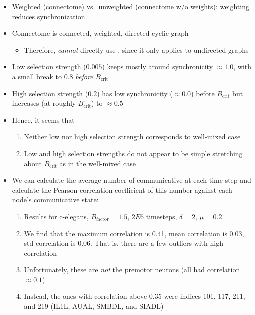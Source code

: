 \documentclass[openacc]{class/rsprocb_new}
\begin{document}
\begin{itemize}
  \item Weighted (connectome) vs.\ unweighted (connectome w/o
    weights): weighting reduces synchronization
  \item Connectome is connected, weighted, directed cyclic graph
  \begin{itemize}
    \item Therefore, \emph{cannot} directly use
      \cite{allen2017evolutionary}, since it only applies to undirected
      graphs
  \end{itemize}
  \item Low selection strength ($0.005$) keeps mostly around synchronicity
    $\approx 1.0$, with a small break to 0.8 \emph{before} $B_{\text{crit}}$
  \item High selection strength ($0.2$) has low synchronicity
    ($\approx 0.0$) before $B_{\text{crit}}$ but increases (at roughly
    $B_{\text{crit}}$) to $\approx 0.5$
  \item Hence, it seems that
  \begin{enumerate}
    \item Neither low nor high selection strength corresponds to
      well-mixed case
    \item Low and high selection strengths do not appear to be simple
      stretching about $B_{\text{crit}}$ as in the well-mixed case
  \end{enumerate}
  \item We can calculate the average number of communicative at each
    time step and calculate the Pearson correlation coefficient of
    this number against each node's communicative state:
  \begin{enumerate}
    \item Results for c-elegans, $B_{\text{factor}} = 1.5$, $2E6$ timesteps,
      $\delta = 2$, $\mu = 0.2$
    \item We find that the maximum correlation is \num{0.41}, mean
      correlation is \num{0.03}, std correlation is \num{0.06}. That
      is, there are a few outliers with high correlation
    \item Unfortunately, these are \emph{not} the premotor neurons
      (all had correlation $\approx \num{0.1}$)
    \item Instead, the ones with correlation above \num{0.35} were
      indices 101, 117, 211, and 219 (IL1L, AUAL, SMBDL, and SIADL)
  \end{enumerate}
\end{itemize}
\end{document}
